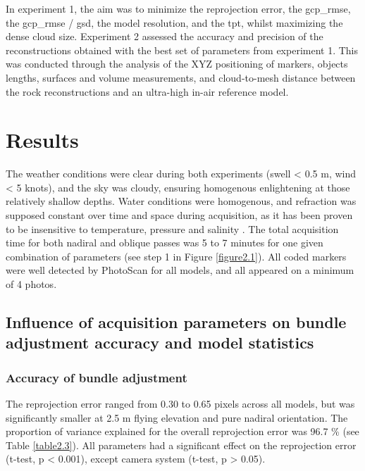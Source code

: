 In experiment 1, the aim was to minimize the reprojection error, the \acrshort{gcp_rmse}, the \acrshort{gcp_rmse} / \acrshort{gsd}, the model resolution, and the \acrshort{tpt}, whilst maximizing the dense cloud size. Experiment 2 assessed the accuracy and precision of the reconstructions obtained with the best set of parameters from experiment 1. This was conducted through the analysis of the XYZ positioning of markers, objects lengths, surfaces and volume measurements, and cloud-to-mesh distance between the rock reconstructions and an ultra-high in-air reference model.

\section[Results]{Results}\label{chapitre2_3}
The weather conditions were clear during both experiments (swell < 0.5 m, wind < 5 knots), and the sky was cloudy, ensuring homogenous enlightening at those relatively shallow depths. Water conditions were homogenous, and refraction was supposed constant over time and space during acquisition, as it has been proven to be insensitive to temperature, pressure and salinity \citep{moore_underwater_1976}. The total acquisition time for both nadiral and oblique passes was 5 to 7 minutes for one given combination of parameters (see step 1 in Figure \ref{figure2.1}). All coded markers were well detected by PhotoScan for all models, and all appeared on a minimum of 4 photos.

\subsection{Influence of acquisition parameters on bundle adjustment accuracy and model statistics}\label{chapitre2_3.1}

\subsubsection{Accuracy of bundle adjustment}\label{chapitre2_3.1.1}
The reprojection error ranged from 0.30 to 0.65 pixels across all models, but was significantly smaller at 2.5 m flying elevation and pure nadiral orientation. The proportion of variance explained for the overall reprojection error was 96.7 \% (see Table \ref{table2.3}). All parameters had a significant effect on the reprojection error (t-test, p < 0.001), except camera system (t-test, p > 0.05). 


